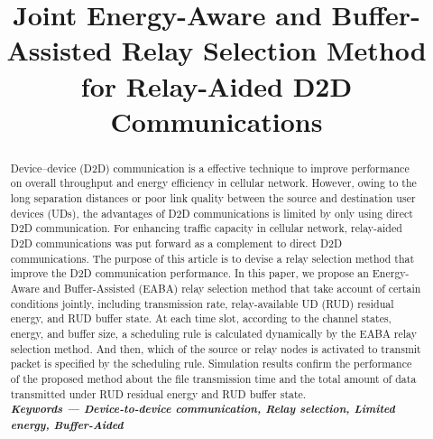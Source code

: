 \documentclass[conference]{IEEEtran}
\begin{document}
\title{Joint Energy-Aware and Buffer-Assisted Relay Selection Method for Relay-Aided D2D Communications}

\author{
}


\maketitle
\begin{abstract}
Device--device (D2D) communication is a effective technique to improve performance on overall throughput and energy efficiency in cellular network. However, owing to the long separation distances or poor link quality between the source and destination user devices (UDs), the advantages of D2D communications is limited by only using direct D2D communication. For enhancing traffic capacity in cellular network, relay-aided D2D communications was put forward as a complement to direct D2D communications. The purpose of this article is to devise a relay selection method that improve the D2D communication performance. In this paper, we propose an Energy-Aware and Buffer-Assisted (EABA) relay selection method that take account of certain conditions jointly, including transmission rate, relay-available UD (RUD) residual energy, and RUD buffer state. At each time slot, according to the channel states, energy, and buffer size, a scheduling rule is calculated dynamically by the EABA relay selection method. And then, which of the source or relay nodes is activated to transmit packet is specified by the scheduling rule. Simulation results confirm the performance of the proposed method about the file transmission time and the total amount of data transmitted under RUD residual energy and RUD buffer state.
\\
\textbf {\small \emph{Keywords --- Device-to-device communication, Relay selection, Limited energy, Buffer-Aided}}
\end{abstract}
\end{document}
